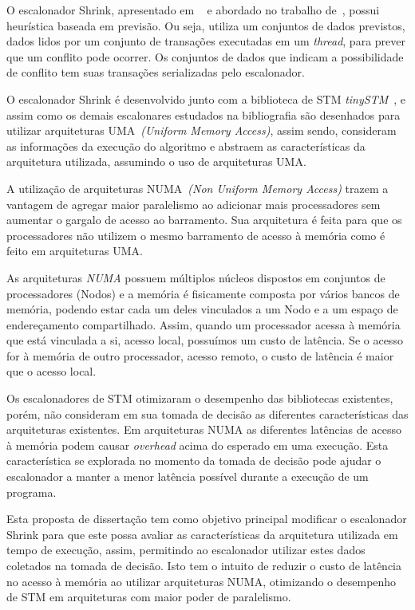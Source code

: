 \documentclass[diss-proposta,nocipinfo]{texufpel}
\begin{document}
O escalonador Shrink, apresentado em ~\cite{dragojevic09} e abordado no trabalho de~\cite{sanzo17}, possui heurística baseada em previsão. Ou seja, utiliza um conjuntos de dados previstos, dados lidos por um conjunto de transações executadas em um \emph{thread}, para prever que um conflito pode ocorrer. Os conjuntos de dados que indicam a possibilidade de conflito tem suas transações serializadas pelo escalonador.

O escalonador Shrink é desenvolvido junto com a biblioteca de STM \emph{tinySTM}~\cite{TINY}, e assim como os demais escalonares estudados na bibliografia são desenhados para utilizar arquiteturas UMA~\emph{(Uniform Memory Access)}, assim sendo, consideram as informações da execução do algoritmo e abstraem as características da arquitetura utilizada, assumindo o uso de arquiteturas UMA.

A utilização de arquiteturas NUMA~\emph{(Non Uniform Memory Access)} trazem a vantagem de agregar maior paralelismo ao adicionar mais processadores sem aumentar o gargalo de acesso ao barramento. Sua arquitetura é feita para que os processadores não utilizem o mesmo barramento de acesso à memória como é feito em arquiteturas UMA.

As arquiteturas \emph{NUMA} possuem múltiplos núcleos dispostos em conjuntos de processadores (Nodos) e a memória é fisicamente composta por vários bancos de memória, podendo estar cada um deles vinculados a um Nodo e a um espaço de endereçamento compartilhado. Assim, quando um processador acessa à memória que está vinculada a si, acesso local, possuímos um custo de latência. Se o acesso for à memória de outro processador, acesso remoto, o custo de latência é maior que o acesso local.

Os escalonadores de STM otimizaram o desempenho das bibliotecas existentes, porém, não consideram em sua tomada de decisão as diferentes características das arquiteturas existentes. Em arquiteturas NUMA as diferentes latências de acesso à memória podem causar \emph{overhead} acima do esperado em uma execução. Esta característica se explorada no momento da tomada de decisão pode ajudar o escalonador a manter a menor latência possível durante a execução de um programa.

Esta proposta de dissertação tem como objetivo principal modificar o escalonador Shrink para que este possa avaliar as características da arquitetura utilizada em tempo de execução, assim, permitindo ao escalonador utilizar estes dados coletados na tomada de decisão. Isto tem o intuito de reduzir o custo de latência no acesso à memória ao utilizar arquiteturas NUMA, otimizando o desempenho de STM em arquiteturas com maior poder de paralelismo.
\end{document}
